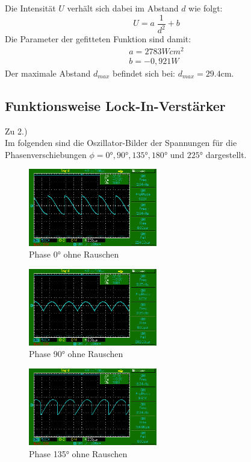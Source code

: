 Die Intensität $U$ verhält sich dabei im Abstand $d$ wie folgt:
\begin{equation*}
    U=a\;\frac{1}{d^2}+b
\end{equation*}
Die Parameter der gefitteten Funktion sind damit:
\begin{align}
    a= 2783 Wcm^2\\
    b= -0,921 W
\end{align}
Der maximale Abstand $d_{max}$ befindet sich bei: $d_{max}=29.4$cm.

\subsection{Funktionsweise Lock-In-Verstärker}
Zu 2.)\\
Im folgenden sind die Oszillator-Bilder der Spannungen für die Phasenverschiebungen $\phi = 0°, 90°, 135°, 180°$ und $225°$ dargestellt.

\begin{figure}
    \centering
    \includegraphics[width=0.5\textwidth]{bilder/MAP001.png}
    \caption{Phase 0° ohne Rauschen}        
    \label{fig:MAP001}
\end{figure}

\begin{figure}
    \centering
    \includegraphics[width=0.5\textwidth]{bilder/MAP002.png}
    \caption{Phase 90° ohne Rauschen}        
    \label{fig:MAP002}
\end{figure}

\begin{figure}
    \centering
    \includegraphics[width=0.5\textwidth]{bilder/MAP005.png}
    \caption{Phase 135° ohne Rauschen}        
    \label{fig:MAP005}
\end{figure}

